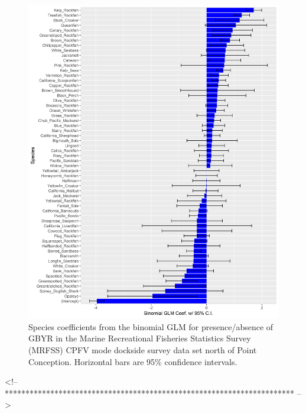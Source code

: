 \documentclass[12pt,]{article}
\begin{document}
\FloatBarrier

\begin{figure}
\centering
\includegraphics{Figures/Fleet11_SM_filter.png}
\caption{Species coefficients from the binomial GLM for presence/absence
of GBYR in the Marine Recreational Fisheries Statistics Survey (MRFSS)
CPFV mode dockside survey data set north of Point Conception. Horizontal
bars are 95\% confidence intervals. \label{fig:Fleet11_SM_filter}}
\end{figure}

\FloatBarrier
<!-- ********************************************************************** -->
\end{document}
